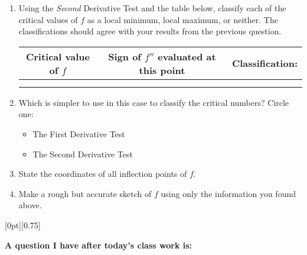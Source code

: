 \documentclass[11pt]{article}
\newcommand{\cuthere}{%
\noindent
\raisebox{-2.8pt}[0pt][0.75\baselineskip]{\small\ding{34}}
\unskip{\tiny\dotfill}
}
\begin{document}
\begin{enumerate}
	\item Using the \emph{Second} Derivative Test and the table below, classify each of the critical values of $f$ as a local minimum, local maximum, or neither. The classifications should agree with your results from the previous question. 
	
	\begin{center}
		\begin{tabular}{c|c|c}
			Critical value of $f$ & Sign of $f''$ evaluated at this point & Classification: \\ \hline
		\hspace{0.5in} & \hspace{0.5in} & \hspace{0.5in} \\ \hline
		\hspace{0.5in} & \hspace{0.5in} & \hspace{0.5in} 
		\end{tabular}
	\end{center}
	
	
	\item Which is simpler to use in this case to classify the critical numbers? Circle one: 
	\begin{itemize}
		\item The First Derivative Test 
		\item The Second Derivative Test
	\end{itemize}

	\item State the coordinates of all inflection points of $f$. 
	\vspace{0.5in}
	
	
	\item Make a rough but accurate sketch of $f$ using only the information you found above. 
\end{enumerate}

\vfill 

\cuthere

\noindent
\textbf{A question I have after today's class work is:}

\vspace{1in}
\end{document}
